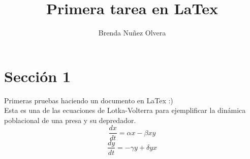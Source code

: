 \documentclass[a4paper,10pt]{article}
\title{Primera tarea en LaTex} %
\author{Brenda Nuñez Olvera} %
\begin{document}
\maketitle

% 

\section{Sección 1}

Primeras pruebas haciendo un documento en LaTex :) \\ %

Esta es una de las ecuaciones de Lotka-Volterra para ejemplificar la dinámica poblacional de una presa y su depredador. \\ %


$$\dfrac{dx}{dt}= \alpha x - \beta xy$$
$$\dfrac{dy}{dt}= -\gamma y + \delta yx$$
\end{document}
